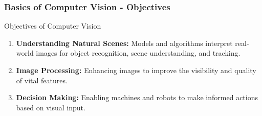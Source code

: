 \documentclass[aspectratio=169]{beamer}
\begin{document}
\begin{frame}[fragile]
    \frametitle{Basics of Computer Vision - Objectives}
    \begin{block}{Objectives of Computer Vision}
        \begin{enumerate}
            \item \textbf{Understanding Natural Scenes:} Models and algorithms interpret real-world images for object recognition, scene understanding, and tracking.
            \item \textbf{Image Processing:} Enhancing images to improve the visibility and quality of vital features.
            \item \textbf{Decision Making:} Enabling machines and robots to make informed actions based on visual input.
        \end{enumerate}
    \end{block}
\end{frame}
\end{document}
